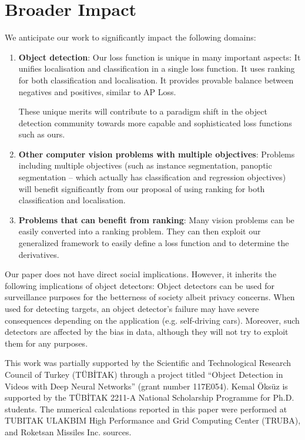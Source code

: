 \documentclass{article}
\begin{document}
 \section*{Broader Impact}

We anticipate our work to significantly impact the following  domains: 
\begin{enumerate}
    \item \textbf{Object detection}: Our loss function is unique in many important aspects: It unifies localisation and classification in a single loss function. It uses ranking for both classification and localisation. It provides provable balance between negatives and positives, similar to AP Loss. 
    
    These unique merits will contribute to a paradigm shift in the object detection community towards more capable and sophisticated loss functions such as ours. 
    
    \item \textbf{Other computer vision problems with multiple objectives}: Problems including multiple objectives (such as instance segmentation, panoptic segmentation -- which actually has classification and regression objectives) will benefit significantly from our proposal of using ranking for both classification and localisation.     


    \item \textbf{Problems that can benefit from ranking}: Many vision problems can be easily converted into a ranking problem. They can then exploit our generalized framework to easily define a loss function and to determine the derivatives. 
    


\end{enumerate}


Our paper does not have direct social implications. However, it inherits the following implications of object detectors: Object detectors can be used for surveillance purposes for the betterness of society albeit privacy concerns. When used for detecting targets, an object detector's failure may have severe consequences depending on the application (e.g. self-driving cars). Moreover, such detectors are affected by the bias in data, although they will not try to exploit them for any purposes.

 \begin{ack}
This work was partially supported by the Scientific and Technological Research Council of Turkey (T\"UB\.ITAK) through a project titled ``Object Detection in Videos with Deep Neural Networks'' (grant number 117E054). Kemal \"Oks\"uz is supported by the T\"UB\.ITAK 2211-A National Scholarship Programme for Ph.D. students. The numerical calculations reported in this paper were performed at TUBITAK ULAKBIM High Performance and Grid Computing Center (TRUBA), and Roketsan Missiles Inc. sources.
\end{ack} 


\appendix
\end{document}
